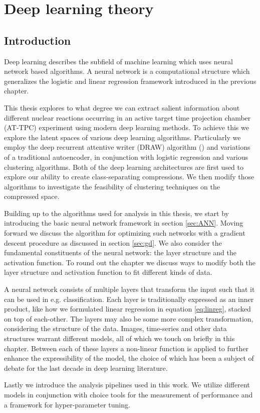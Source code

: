 \chapter{Deep learning theory}\label{ch:ml}
\section{Introduction}

Deep learning describes the subfield of machine learning which uses neural network based algorithms. A neural network is a computational structure which generalizes the logistic and linear regression framework introduced in the previous chapter.


This thesis explores to what degree we can extract salient information about different nuclear reactions occurring in an active target time projection chamber (AT-TPC) experiment using modern deep learning methods. To achieve this we explore the latent spaces of various deep learning algorithms. Particularly we employ the deep recurrent attentive writer (DRAW) algorithm (\cite{Gregor2015}) and variations of a traditional autoencoder, in conjunction with logistic regression and various clustering algorithms. Both of the deep learning architectures are first used to explore our ability to create class-separating compressions. We then modify those algorithms to investigate the feasibility of clustering techniques on the compressed space. 

Building up to the algorithms used for analysis in this thesis, we start by introducing the basic neural network framework in section \ref{sec:ANN}. Moving forward we discuss the algorithm for optimizing such networks with a gradient descent procedure as discussed in section \ref{sec:gd}. We also consider the fundamental constituents of the neural network: the layer structure and the activation function. To round out the chapter we discuss ways to modify both the layer structure and activation function to fit different kinds of data.

A neural network consists of multiple layers that transform the input such that it can be used in e.g. classification. Each layer is traditionally expressed as an inner product, like how we formulated linear regression in equation \ref{eq:linreg}, stacked on top of each-other. The layers may also be some more complex transformation, considering the structure of the data. Images, time-series and other data structures warrant different models, all of which we touch on briefly in this chapter. Between each of these layers a non-linear function is applied to further enhance the expressibility of the model, the choice of which has been a subject of debate for the last decade in deep learning literature.

Lastly we introduce the analysis pipelines used in this work. We utilize different models in conjunction with choice tools for the measurement of performance and a framework for hyper-parameter tuning. 